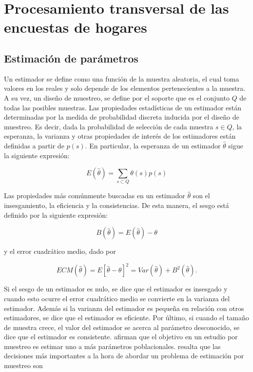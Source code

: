 \documentclass[
  12pt,
  spanish,
]{book}
\begin{document}
\hypertarget{part-procesamiento-transversal-de-las-encuestas-de-hogares}{%
\part{Procesamiento transversal de las encuestas de hogares}\label{part-procesamiento-transversal-de-las-encuestas-de-hogares}}

\hypertarget{estimaciuxf3n-de-paruxe1metros}{%
\chapter{Estimación de parámetros}\label{estimaciuxf3n-de-paruxe1metros}}

Un estimador se define como una función de la muestra aleatoria, el cual toma valores en los reales y solo depende de los elementos pertenecientes a la muestra. A su vez, un diseño de muestreo, se define por el soporte que es el conjunto \(Q\) de todas las posibles muestras. Las propiedades estadísticas de un estimador están determinadas por la medida de probabilidad discreta inducida por el diseño de muestreo. Es decir, dada la probabilidad de selección de cada muestra \(s \in Q\), la esperanza, la varianza y otras propiedades de interés de los estimadores están definidas a partir de \(p(s)\). En particular, la esperanza de un estimador \(\hat\theta\) sigue la siguiente expresión:

\[
E(\hat\theta) = \sum_{s\subset Q} \theta(s)p(s)
\]

Las propiedades más comúnmente buscadas en un estimador \(\hat\theta\) son el insesgamiento, la eficiencia y la consistencias. De esta manera, el sesgo está definido por la siguiente expresión:

\[
B(\hat\theta)=E(\hat\theta)-\theta
\]

y el error cuadrático medio, dado por

\[
ECM(\hat\theta)=E[\hat\theta-\theta]^2=Var(\hat\theta)+B^2(\hat\theta).
\]

Si el sesgo de un estimador es nulo, se dice que el estimador es insesgado y cuando esto ocurre el error cuadrático medio se convierte en la varianza del estimador. Además si la varianza del estimador es pequeña en relación con otros estimadores, se dice que el estimador es eficiente. Por último, si cuando el tamaño de muestra crece, el valor del estimador se acerca al parámetro desconocido, se dice que el estimador es consistente. \citet{Sarndal_Swensson_Wretman_2003} afirman que el objetivo en un estudio por muestreo es estimar uno a más parámetros poblacionales. \citet{Gutierrez_2016} resalta que las decisiones más importantes a la hora de abordar un problema de estimación por muestreo son
\end{document}
